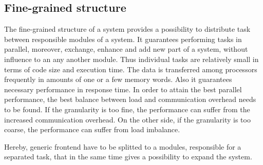 \subsection {Fine-grained structure}
The fine-grained structure of a system provides a possibility to distribute task between responsible modules of a system. It guarantees performing tasks in parallel, moreover, exchange, enhance and add new part of a system, without influence to an any another module. Thus individual tasks are relatively small in terms of code size and execution time. The data is transferred among processors frequently in amounts of one or a few memory words. Also it guarantees necessary performance in response time. In order to attain the best parallel performance, the best balance between load and communication overhead needs to be found. If the granularity is too fine, the performance can suffer from the increased communication overhead. On the other side, if the granularity is too coarse, the performance can suffer from load imbalance.

Hereby, generic frontend have to be splitted to a modules, responsible for a separated task, that in the same time gives a possibility to expand the system.

